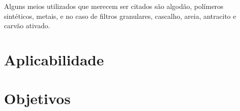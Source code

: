 Alguns meios utilizados que merecem ser citados são algodão, polímeros
sintéticos, metais, e no caso de filtros granulares, cascalho, areia, antracito
e carvão ativado.


\section{Aplicabilidade}\label{sec:aplicabilidade}

\section{Objetivos}\label{sec:objetivos} 


